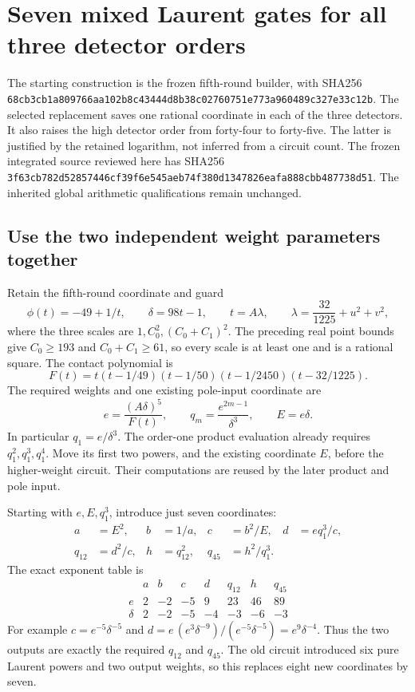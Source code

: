 \section{Seven mixed Laurent gates for all three detector orders}

The starting construction is the frozen fifth-round builder, with SHA256
\texttt{68cb3cb1a809766aa102b8c43444d8b38c02760751e773a960489c327e33c12b}.
The selected replacement saves one rational coordinate in each of the three
detectors. It also raises the high detector order from forty-four to
forty-five. The latter is justified by the retained logarithm, not inferred
from a circuit count. The frozen integrated source reviewed here has SHA256
\texttt{3f63cb782d52857446cf39f6e545aeb74f380d1347826eafa888cbb487738d51}.
The inherited global arithmetic qualifications remain unchanged.

\subsection{Use the two independent weight parameters together}

Retain the fifth-round coordinate and guard
\[
 \phi(t)=-49+1/t,\qquad \delta=98t-1,
 \qquad t=A\lambda,
 \qquad \lambda=\frac{32}{1225}+u^2+v^2,
\]
where the three scales are $1,C_0^2,(C_0+C_1)^2$. The preceding
real point bounds give $C_0\ge193$ and $C_0+C_1\ge61$, so every
scale is at least one and is a rational square. The contact polynomial is
\[
 F(t)=t(t-1/49)(t-1/50)(t-1/2450)(t-32/1225).
\]
The required weights and one existing pole-input coordinate are
\[
 e=\frac{(A\delta)^5}{F(t)},\qquad
 q_m=\frac{e^{2m-1}}{\delta^3},\qquad E=e\delta.
\]
In particular $q_1=e/\delta^3$. The order-one product evaluation already
requires $q_1^2,q_1^3,q_1^4$. Move its first two powers, and the existing
coordinate $E$, before the higher-weight circuit. Their computations
are reused by the later product and pole input.

Starting with $e,E,q_1^3$, introduce just seven coordinates:
\begin{align*}
 a&=E^2,& b&=1/a,& c&=b^2/E,& d&=e q_1^3/c,\\
 q_{12}&=d^2/c,& h&=q_{12}^2,& q_{45}&=h^2/q_1^3.
\end{align*}
The exact exponent table is
\[
\begin{array}{c|rrrrrrr}
 &a&b&c&d&q_{12}&h&q_{45}\\ \hline
 e&2&-2&-5&9&23&46&89\\
 \delta&2&-2&-5&-4&-3&-6&-3
\end{array}
\]
For example $c=e^{-5}\delta^{-5}$ and
$d=e\,(e^3\delta^{-9})/(e^{-5}\delta^{-5})=e^9\delta^{-4}$.
Thus the two outputs are exactly the required $q_{12}$ and $q_{45}$.
The old circuit introduced six pure Laurent powers and two output
weights, so this replaces eight new coordinates by seven.

